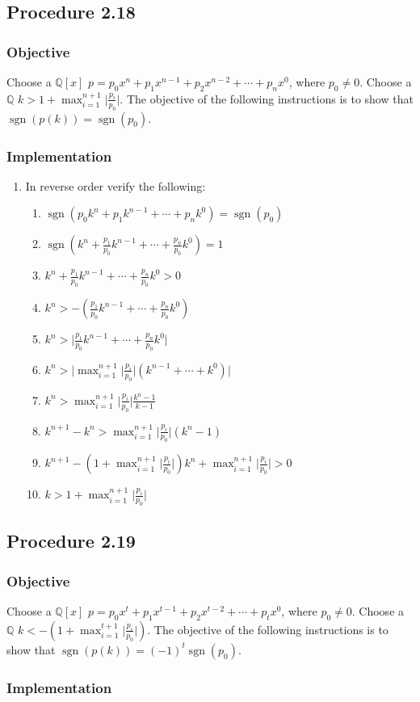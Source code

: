 \documentclass[twocolumn]{article}
\DeclareMathOperator{\sgn}{sgn}
\newcommand{\procedure}[2][]{\subsection*{Procedure #2 \ifthenelse{\equal{#1}{}}{}{(#1)}}\label{sec:procedure #2}}
\newcommand{\objective}{\subsubsection*{Objective}}
\newcommand{\implementation}{\subsubsection*{Implementation}}
\begin{document}
		\procedure{2.18}
			\objective
				Choose a $\mathbb{Q}[x]$ $p=p_0x^n+p_1x^{n-1}+p_2x^{n-2}+\cdots+p_nx^0$, where $p_0\ne 0$. Choose a $\mathbb{Q}$ $k>1+\max_{i=1}^{n+1}\lvert\frac{p_i}{p_0}\rvert$. The objective of the following instructions is to show that $\sgn(p(k))=\sgn(p_0)$.
			\implementation
				\begin{enumerate}
					\item In reverse order verify the following:
					\begin{enumerate}
						\item \textbf{$\sgn(p_0k^n+p_1k^{n-1}+\cdots+p_nk^0)=\sgn(p_0)$}
						\item $\sgn(k^n+\frac{p_1}{p_0}k^{n-1}+\cdots+\frac{p_n}{p_0}k^0)=1$
						\item $k^n+\frac{p_1}{p_0}k^{n-1}+\cdots+\frac{p_n}{p_0}k^0>0$
						\item $k^n>-(\frac{p_1}{p_0}k^{n-1}+\cdots+\frac{p_n}{p_0}k^0)$
						\item $k^n>\lvert \frac{p_1}{p_0}k^{n-1}+\cdots+\frac{p_n}{p_0}k^0\rvert$
						\item $k^n>\lvert\max_{i=1}^{n+1}\lvert \frac{p_i}{p_0}\rvert(k^{n-1}+\cdots+k^0)\rvert$
						\item $k^n>\max_{i=1}^{n+1}\lvert \frac{p_i}{p_0}\rvert\frac{k^n-1}{k-1}$
						\item $k^{n+1}-k^n>\max_{i=1}^{n+1}\lvert \frac{p_i}{p_0}\rvert(k^n-1)$
						\item $k^{n+1}-(1+\max_{i=1}^{n+1}\lvert \frac{p_i}{p_0}\rvert)k^n+\max_{i=1}^{n+1}\lvert \frac{p_i}{p_0}\rvert>0$
						\item $k>1+\max_{i=1}^{n+1}\lvert \frac{p_i}{p_0}\rvert$
					\end{enumerate}
				\end{enumerate}
		\procedure{2.19}
			\objective
				Choose a $\mathbb{Q}[x]$ $p=p_0x^t+p_1x^{t-1}+p_2x^{t-2}+\cdots+p_tx^0$, where $p_0\ne 0$. Choose a $\mathbb{Q}$ $k<-(1+\max_{i=1}^{t+1}\lvert\frac{p_i}{p_0}\rvert)$. The objective of the following instructions is to show that $\sgn(p(k))=(-1)^t\sgn(p_0)$.
			\implementation
\end{document}
